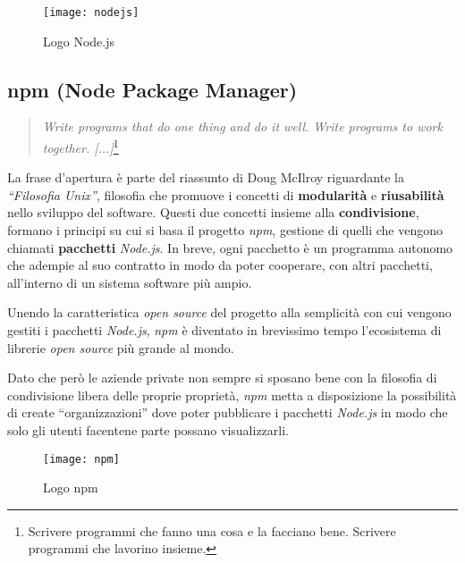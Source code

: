\begin{figure}[H]
\begin{center}
\texttt{[image: nodejs]}
\caption{Logo Node.js}
\label{fig:nodejs_logo}
\end{center}
\end{figure}

\subsection{npm (Node Package Manager)}
\begin{quote}
\textit{Write programs that do one thing and do it well. Write programs to work
together. [...]}\footnote{Scrivere programmi che fanno una cosa e la facciano
bene. Scrivere programmi che lavorino insieme.}
\end{quote}

La frase d'apertura è parte del riassunto di Doug McIlroy riguardante la
\textit{``Filosofia Unix''}, filosofia che promuove i concetti di
\textbf{modularità} e \textbf{riusabilità} nello sviluppo del software. Questi
due concetti insieme alla \textbf{condivisione}, formano i principi su cui si
basa il progetto \textit{npm}, gestione di quelli che vengono chiamati
\textbf{pacchetti} \textit{Node.js}. In breve, ogni pacchetto è un programma
autonomo che adempie al suo \gls{contratto} in modo da poter cooperare, con
altri pacchetti, all'interno di un sistema software più ampio.

Unendo la caratteristica \textit{open source} del progetto alla semplicità con
cui vengono gestiti i pacchetti \textit{Node.js}, \textit{npm} è diventato in
brevissimo tempo l'ecosistema di librerie \textit{open source} più grande al
mondo.

Dato che però le aziende private non sempre si sposano bene con la filosofia di
condivisione libera delle proprie proprietà, \textit{npm} metta a disposizione
la possibilità di create ``organizzazioni'' dove poter pubblicare i pacchetti
\textit{Node.js} in modo che solo gli utenti facentene parte possano
visualizzarli.

\begin{figure}[H]
\begin{center}
\texttt{[image: npm]}
\caption{Logo npm}
\label{fig:npm_logo}
\end{center}
\end{figure}


